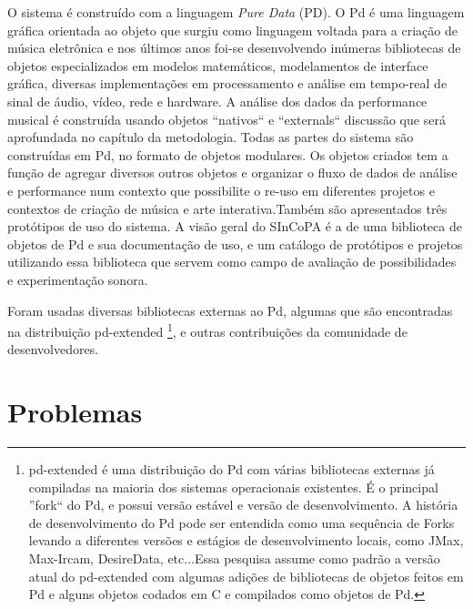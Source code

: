 \documentclass{ppgmus}
\newcommand{\pd}{PD}
\begin{document}
O sistema é construído com a linguagem \textit{Pure Data} (\pd). O Pd é uma linguagem gráfica orientada ao objeto que surgiu
como linguagem voltada para a criação de música eletrônica e nos últimos anos foi-se desenvolvendo inúmeras
bibliotecas de objetos especializados em modelos matemáticos, modelamentos de interface gráfica, diversas 
implementações
em processamento e análise em tempo-real de sinal de áudio, vídeo, rede e hardware. 
A análise dos dados da performance musical é construída usando objetos ``nativos`` e ``externals`` 
discussão que será
aprofundada no capítulo da metodologia. 
Todas as partes do sistema são construídas em Pd, no formato de objetos
modulares. Os objetos criados tem a função de agregar diversos outros objetos e organizar o fluxo de dados
de análise e performance num contexto que possibilite o re-uso em diferentes projetos e contextos de 
criação de música e arte interativa.Também são apresentados três protótipos de uso do sistema. A visão geral do
SInCoPA é a de uma biblioteca de objetos de Pd e sua documentação de uso, e um catálogo de protótipos e projetos
utilizando essa biblioteca que servem como campo de avaliação de possibilidades e experimentação sonora.


Foram usadas diversas bibliotecas externas ao Pd, algumas que são encontradas na distribuição pd-extended
\footnote{pd-extended é uma distribuição do Pd com várias bibliotecas externas já compiladas na maioria dos
sistemas operacionais existentes. É o principal ''fork`` do Pd, e possui versão estável e versão de desenvolvimento.
A história de desenvolvimento do Pd pode ser entendida como uma sequência de Forks levando a diferentes versões 
e estágios de desenvolvimento locais, como JMax, Max-Ircam, DesireData, etc...Essa pesquisa assume como padrão
a versão atual do pd-extended com algumas adições de bibliotecas de objetos feitos em Pd e alguns objetos codados
em C e compilados como objetos de Pd.}, 
e outras contribuições da comunidade de desenvolvedores.

\section{Problemas}

\end{document}
